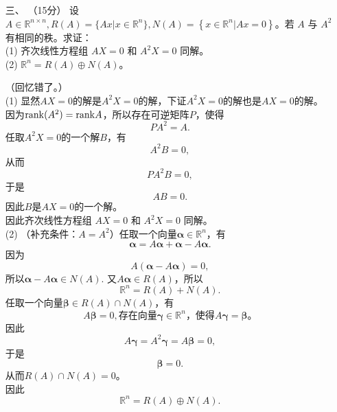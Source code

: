 \begin{enumerate}[1~]
\begin{solution}
\end{solution}

\item[三、]（15分）
设 $A \in \mathbb { R } ^ { n \times n } , R ( A ) = \{ A x | x \in \mathbb { R } ^ { n } \} , N ( A ) = \left\{ x \in \mathbb { R } ^ { n } | A x = 0 \right\}$。若 $A$ 与 $A^2$ 有相同的秩。求证：\\
(1) 齐次线性方程组 $AX = 0$ 和 $A^2X = 0$ 同解。\\
(2) $\mathbb { R } ^ { n } = R ( A ) \oplus N ( A )$。
\begin{solution}
（回忆错了。）\\
(1) 显然$AX=0$的解是$A^2X=0$的解，下证$A^2X=0$的解也是$AX=0$的解。\\
因为${\rm rank}(A^2)={\rm rank}A$，所以存在可逆矩阵$P$，使得\[
PA^2=A.
\]
任取$A^2X=0$的一个解$B$，有\[
A^2B=0,
\]
从而\[
PA^2B=0,
\]
于是\[
AB=0.
\]
因此$B$是$AX=0$的一个解。\\
因此齐次线性方程组 $AX = 0$ 和 $A^2X = 0$ 同解。\\
(2) （补充条件：$A=A^2$）任取一个向量$\boldsymbol{\alpha}\in \mathbb{R}^n$，有\[
\boldsymbol{\alpha}={A}\boldsymbol{\alpha}+\boldsymbol{\alpha}-{A}\boldsymbol{\alpha}.
\]
因为\[
A(\boldsymbol{\alpha}-{A}\boldsymbol{\alpha})=0,
\]
所以$
\boldsymbol{\alpha}-{A}\boldsymbol{\alpha}\in N(A).
$
又$A\boldsymbol{\alpha}\in R(A)$，所以\[
\mathbb { R } ^ { n } = R ( A ) + N ( A ).
\]
任取一个向量$\boldsymbol{\beta}\in R(A)\cap N(A)$，有\[
A\boldsymbol{\beta}=0, \text{存在向量$\boldsymbol{\gamma}\in \mathbb{R}^n$，使得$A\boldsymbol{\gamma}=\boldsymbol{\beta}$。}
\]
因此\[
A\boldsymbol{\gamma}=A^2\boldsymbol{\gamma}=A\boldsymbol{\beta}=0,
\]
于是\[
\boldsymbol{\beta} = 0.
\]
从而$R(A)\cap N(A)=0$。\\
因此\[
\mathbb { R } ^ { n } = R ( A ) \oplus N ( A ).
\]
\end{solution}


\end{enumerate}
